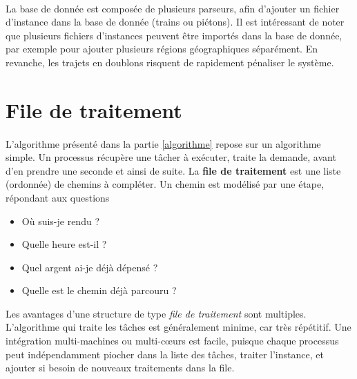 \documentclass[a4paper,10pt,twoside]{report}
\begin{document}
    \paragraph{}La base de donnée est composée de plusieurs parseurs, afin d'ajouter un fichier d'instance dans la base de donnée (trains ou piétons).
    Il est intéressant de noter que plusieurs fichiers d'instances peuvent être importés dans la base de donnée, par exemple pour ajouter plusieurs régions géographiques séparément. En revanche, les trajets en doublons risquent de rapidement pénaliser le système.
    \section{File de traitement}
    \paragraph{}L'algorithme présenté dans la partie \ref{algorithme} repose sur un algorithme simple. Un processus récupère une tâcher à exécuter, traite la demande, avant d'en prendre une seconde et ainsi de suite. La \textbf{file de traitement} est une liste (ordonnée) de chemins à compléter. Un chemin est modélisé par une étape, répondant aux questions 
    \begin{itemize}
    \item Où suis-je rendu ?
    \item Quelle heure est-il ?
    \item Quel argent ai-je déjà dépensé ?
    \item Quelle est le chemin déjà parcouru ?
    \end{itemize}
    
    Les avantages d'une structure de type \textit{file de traitement} sont multiples. L'algorithme qui traite les tâches est généralement minime, car très répétitif.
    Une intégration multi-machines ou multi-c\oe{}urs est facile, puisque chaque processus peut indépendamment piocher dans la liste des tâches, traiter l'instance, et ajouter si besoin de nouveaux traitements dans la file.
    
    
\end{document}

